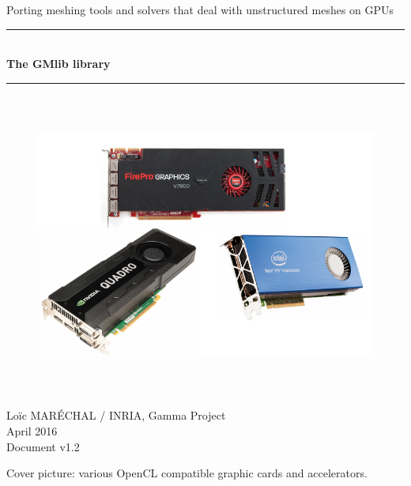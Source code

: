 \documentclass[a4paper,12pt]{article}
\newcommand{\HRule}{\rule{\linewidth}{1mm}}
\begin{document}
%
%

\begin{titlepage}

\begin{center}
\huge Porting meshing tools and solvers that deal with unstructured meshes on GPUs
\HRule \\
\medskip
{\Huge \bfseries The GMlib library} \\
\HRule
\end{center}


\begin{figure}[htbp]
\begin{center}
\includegraphics[height=10cm]{gpu.pdf}
\end{center}
\end{figure}


\begin{flushright}
\Large Lo\"ic MAR\'ECHAL / INRIA, Gamma Project\\
\Large April 2016 \\
\normalsize Document v1.2
\end{flushright}

\end{titlepage}

\clearpage

\setcounter{tocdepth}{2}
\tableofcontents
\vfill

\footnotesize{Cover picture: various OpenCL compatible graphic cards and accelerators.}
\normalsize
\end{document}
